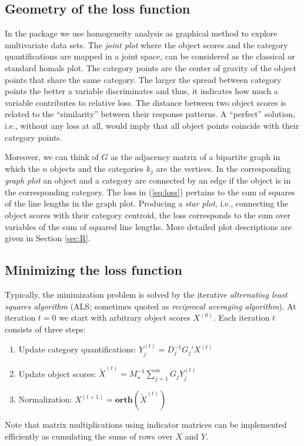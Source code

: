 \documentclass[article]{Z}
\begin{document}
\subsection{Geometry of the loss function}
In the  package we use homogeneity analysis as graphical method to explore multivariate data sets. The \emph{joint plot} where the object scores and the category quantifications are mapped in a joint space, can be considered as the classical or standard homals plot. The category points are the center of gravity of the object points that share the same category. The larger the spread between category points the better a variable discriminates and thus, it indicates how much a variable contributes to relative loss. The distance between two object scores is related to the ``similarity'' between their response patterns. A ``perfect'' solution, i.e., without any loss at all, would imply that all object points coincide with their category points.

Moreover, we can think of $G$ as the adjacency matrix of a bipartite graph in which the
$n$ objects and the categories $k_j$ are the vertices. In the corresponding \emph{graph plot} an object and a category are connected by an edge if the object is in the corresponding category. The loss in (\ref{eq:loss}) pertains to the sum of squares of the line lengths in the graph plot. Producing a \emph{star plot}, i.e., connecting the object scores with their category centroid, the loss corresponds to the sum over variables of the sum of squared line lengths. More detailed plot descriptions are given in Section \ref{sec:R}.


\subsection{Minimizing the loss function}
Typically, the minimization problem is solved by the iterative \emph{alternating least squares algorithm} (ALS; sometimes quoted as \emph{reciprocal averaging algorithm}). At iteration $t=0$ we start with arbitrary object scores $X^{(0)}$. Each iteration $t$ consists of three steps:
\begin{enumerate}
\item Update category quantifications: $Y_j^{(t)}=D_j^{-1}G_j'X^{(t)}$
\item Update object scores: $\tilde X^{(t)}=M_\star^{-1}\sum_{j=1}^m G_j^{}Y_j^{(t)}$
\item Normalization: $X^{(t+1)}=\mathbf{orth}(\tilde X^{(t)})$
\end{enumerate}
Note that matrix multiplications using indicator matrices can be implemented efficiently as cumulating the sums of rows over $X$ and $Y$. 
\end{document}
